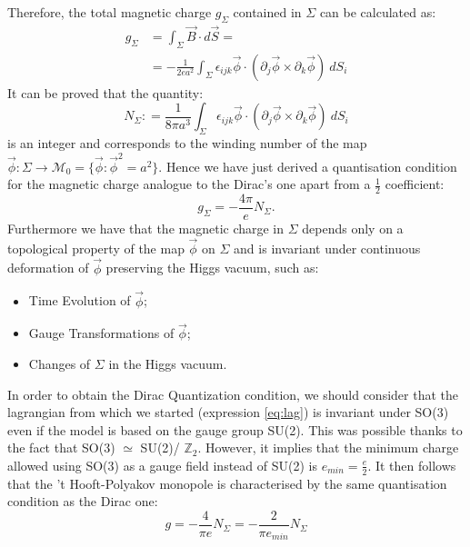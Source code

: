 \documentclass[main.tex]{subfiles}
\begin{document}
Therefore, the total magnetic charge $g_\Sigma$ contained in $\Sigma$ can be  calculated as: 
\begin{equation}
\begin{split}
g_\Sigma &= \int_\Sigma \vec{B} \cdot d\vec{S} = \\
         &= - \frac{1}{2ea^2}\int_\Sigma  \epsilon_{ijk} \vec{\phi} \cdot \left(  \partial_j\vec{\phi} \times \partial_k \vec{\phi}  \right) \ dS_i
\end{split}
\end{equation} 
It can be proved that the quantity:
\begin{equation}
N_\Sigma : = \frac{1}{8 \pi a^3} \int_\Sigma  \epsilon_{ijk} \vec{\phi} \cdot \left(  \partial_j\vec{\phi} \times \partial_k \vec{\phi}  \right) \ dS_i
\end{equation}
is an integer and corresponds to the winding number of the map $\vec{\phi} \colon \Sigma \to \mathcal{M}_0 = \{ \vec{\phi} : \vec{\phi}^2 = a^2 \}$. 
Hence we have just derived a quantisation condition for the magnetic charge analogue to the Dirac's one apart from a $\frac{1}{2}$ coefficient: 
\begin{equation}
g_\Sigma = -\frac{4\pi}{e} N_\Sigma.
\end{equation}
Furthermore we have that the magnetic charge in $\Sigma$ depends only on  a topological property of the map $\vec{\phi}$ on $\Sigma$ and is invariant under continuous deformation of $\vec{\phi}$ preserving the Higgs vacuum, such as:
\begin{itemize}
    \item Time Evolution of $\vec{\phi}$;
    \item Gauge Transformations of $\vec{\phi}$;
    \item Changes of $\Sigma$ in the Higgs vacuum.
\end{itemize}
In order to obtain the Dirac Quantization condition, we should consider that the lagrangian from which we started (expression \ref{eq:lag}) is invariant under SO(3) even if the model is based on the gauge group SU(2). This was possible thanks to the fact that SO(3) $ \simeq$ SU(2)/ $\mathbb{Z}_2$. However, it implies that the minimum charge allowed using SO(3) as a gauge field instead of SU(2) is $ e_{min} =\frac{e}{2}$.
It then follows that the 't Hooft-Polyakov monopole is characterised by the same quantisation condition as the Dirac one: 
\begin{equation}
g = - \frac{4}{\pi e} N_\Sigma= - \frac{2}{\pi e_{min}} N_\Sigma
\end{equation}
\end{document}
